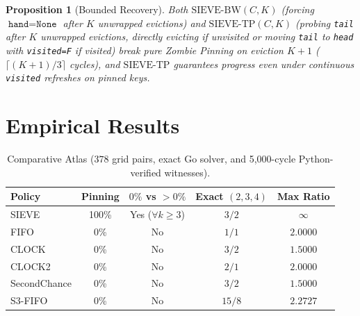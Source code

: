 \documentclass[10pt,twocolumn]{article}
\newtheorem{proposition}{Proposition}
\begin{document}
\begin{proposition}[Bounded Recovery]
Both $\mathrm{SIEVE\text{-}BW}(C,K)$ (forcing $\texttt{hand}=\texttt{None}$ after $K$ unwrapped evictions) and $\mathrm{SIEVE\text{-}TP}(C,K)$ (probing \texttt{tail} after $K$ unwrapped evictions, directly evicting if unvisited or moving \texttt{tail} to \texttt{head} with \texttt{visited=F} if visited) break pure Zombie Pinning on eviction $K+1$ ($\lceil (K+1)/3\rceil$ cycles), and $\mathrm{SIEVE\text{-}TP}$ guarantees progress even under continuous \texttt{visited} refreshes on pinned keys.
\end{proposition}

\section{Empirical Results}

\begin{table}[t]
\centering
\caption{Comparative Atlas ($378$ grid pairs, exact Go solver, and 5,000-cycle Python-verified witnesses).}
\label{tab:atlas}
\small
\begin{tabular}{lcccc}
\toprule
Policy & Pinning & $0\%$ vs $>0\%$ & Exact $(2,3,4)$ & Max Ratio \\
\midrule
SIEVE & 100\% & Yes ($\forall k \ge 3$) & $3/2$ & $\infty$ \\
FIFO & 0\% & No & $1/1$ & $2.0000$ \\
CLOCK & 0\% & No & $3/2$ & $1.5000$ \\
CLOCK2 & 0\% & No & $2/1$ & $2.0000$ \\
SecondChance & 0\% & No & $3/2$ & $1.5000$ \\
S3-FIFO & 0\% & No & $15/8$ & $2.2727$ \\
\bottomrule
\end{tabular}
\end{table}
\end{document}
